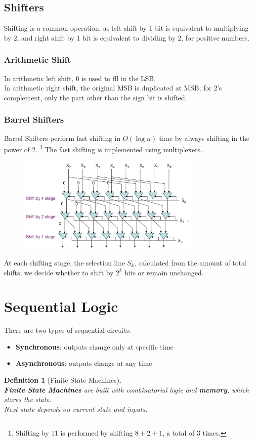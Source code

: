 \documentclass[12pt]{article}
\newtheorem{definition}{Definition}[section]
\theoremstyle{definition}
\begin{document}
\subsection{Shifters}
Shifting is a common operation, as left shift by 1 bit is equivalent to multiplying by 2, and right shift by 1 bit is equivalent to dividing by 2, for positive numbers.
\subsubsection{Arithmetic Shift}
In arithmetic left shift, $0$ is used to fll in the LSB.\\
In arithmetic right shift, the original MSB is duplicated at MSB; for 2's complement, only the part other than the sign bit is shifted.
\subsubsection{Barrel Shifters}
Barrel Shifters perform fast shifting in $O(\log n)$ time by always shifting in the power of $2$. \footnote{Shifting by 11 is performed by shifting $8+2+1$, a total of 3 times.}
The fast shifting is implemented using multiplexers.
\begin{figure}[h]
\centering
\includegraphics[width = 0.8\textwidth]{7_10.png}
\end{figure}
At each shifting stage, the selection line $S_k$, calculated from the amount of total shifts, we decide whether to shift by $2^k$ bits or remain unchanged. 
\clearpage
\section{Sequential Logic}
There are two types of sequential circuits:
\begin{itemize}
  \item \textbf{Synchronous}: outputs change only at specific time
  \item \textbf{Asynchronous}: outputs change at any time
  \end{itemize}
\begin{definition}[Finite State Machines]
\hfill\\\normalfont \textbf{Finite State Machines} are built with combinatorial logic and \textbf{memory}, which stores the state. \\Next state depends on current state and inputs. 
\end{definition}
\end{document}
